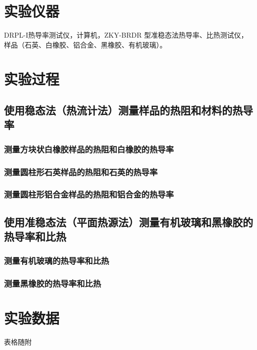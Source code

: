 \documentclass[a4paper,utf8]{article}
\begin{document}
\section{实验仪器}%
    DRPL-I热导率测试仪，计算机，ZKY-BRDR 型准稳态法热导率、比热测试仪，样品（石英、白橡胶、铝合金、黑橡胶、有机玻璃）。
\section{实验过程}%
    \subsection{使用稳态法（热流计法）测量样品的热阻和材料的热导率}
        \subsubsection{测量方块状白橡胶样品的热阻和白橡胶的热导率}
        \subsubsection{测量圆柱形石英样品的热阻和石英的热导率}
        \subsubsection{测量圆柱形铝合金样品的热阻和铝合金的热导率}
    \subsection{使用准稳态法（平面热源法）测量有机玻璃和黑橡胶的热导率和比热}
        \subsubsection{测量有机玻璃的热导率和比热}
        \subsubsection{测量黑橡胶的热导率和比热}
    
\section{实验数据}
    表格随附
\end{document}
